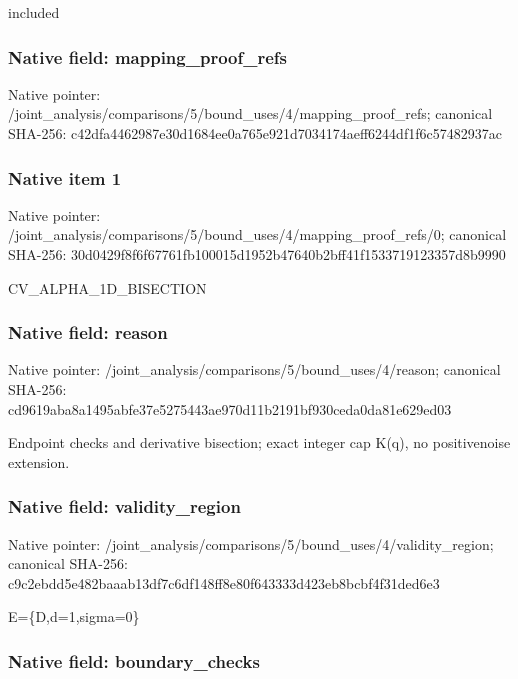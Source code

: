 \documentclass[10pt,a4paper]{article}
\begin{document}
included


\subsubsection{Native field: mapping\_proof\_refs}


Native pointer: /joint\_analysis/comparis\allowbreak{}ons/5/bound\_uses/4/mappi\allowbreak{}ng\_proof\_refs; canonical SHA-256: c42dfa4462987e30d1684ee0\allowbreak{}a765e921d7034174aeff6244\allowbreak{}df1f6c57482937ac



\subsubsection{Native item 1}


Native pointer: /joint\_analysis/comparis\allowbreak{}ons/5/bound\_uses/4/mappi\allowbreak{}ng\_proof\_refs/0; canonical SHA-256: 30d0429f8f6f67761fb10001\allowbreak{}5d1952b47640b2bff41f1533\allowbreak{}719123357d8b9990


CV\_ALPHA\_1D\_BISECTION


\subsubsection{Native field: reason}


Native pointer: /joint\_analysis/comparis\allowbreak{}ons/5/bound\_uses/4/reaso\allowbreak{}n; canonical SHA-256: cd9619aba8a1495abfe37e52\allowbreak{}75443ae970d11b2191bf930c\allowbreak{}eda0da81e629ed03


Endpoint checks and derivative bisection; exact integer cap K(q), no positivenoise extension.


\subsubsection{Native field: validity\_region}


Native pointer: /joint\_analysis/comparis\allowbreak{}ons/5/bound\_uses/4/valid\allowbreak{}ity\_region; canonical SHA-256: c9c2ebdd5e482baaab13df7c\allowbreak{}6df148ff8e80f643333d423e\allowbreak{}b8bcbf4f31ded6e3


E=\{D,d=1,sigma=0\}


\subsubsection{Native field: boundary\_checks}
\end{document}

